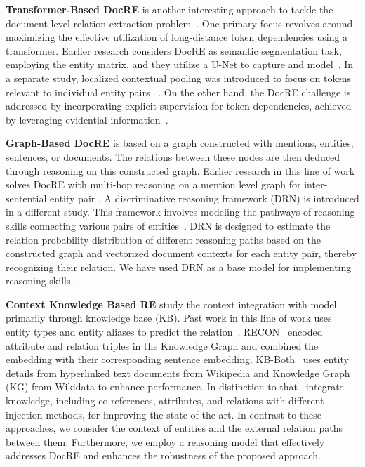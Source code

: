 \documentclass[letterpaper]{article} %
\begin{document}
\textbf{Transformer-Based DocRE} is another interesting approach to tackle the document-level relation extraction problem~\cite{zeng-etal-2020-double}. One primary focus revolves around maximizing the effective utilization of long-distance token dependencies using a transformer.
Earlier research considers DocRE as semantic segmentation task, employing the entity matrix, and they utilize a U-Net to capture and model~\cite{ijcai2021p551}.
In a separate study, localized contextual pooling was introduced to focus on tokens relevant to individual entity pairs ~\cite{DBLP:conf/aaai/Zhou0M021}.
On the other hand, the DocRE challenge is addressed by incorporating explicit supervision for token dependencies, achieved by leveraging evidential information~\cite{DBLP:conf/eacl/MaWO23}.

\textbf{Graph-Based DocRE} is based on a graph constructed with mentions, entities, sentences, or documents. The relations between these nodes are then deduced through reasoning on this constructed graph. Earlier research in this line of work solves DocRE with multi-hop reasoning on a mention level graph for inter-sentential entity pair \cite{zeng-etal-2020-double}.
A discriminative reasoning framework (DRN) is introduced in a different study. This framework involves modeling the pathways of reasoning skills connecting various pairs of entities~\cite{xu-etal-2021-discriminative}. DRN is designed to estimate the relation probability distribution of different reasoning paths based on the constructed graph and vectorized document contexts for each entity pair, thereby recognizing their relation. We have used DRN as a base model for implementing reasoning skills.

\textbf{Context Knowledge Based RE} study the context integration with model primarily through knowledge base (KB). Past work in this line of work uses entity types and entity aliases to predict the relation~\cite{vashishth-etal-2018-reside,10.1007/978-3-030-62419-4_11}. RECON~\cite{DBLP:conf/www/BastosN0MSHK21} encoded attribute and relation triples in the Knowledge Graph and combined the embedding with their corresponding sentence embedding. KB-Both~\cite{DBLP:conf/acl/VerlindenZDDD21} uses entity details from hyperlinked text documents from Wikipedia and Knowledge Graph (KG) from Wikidata to enhance performance.
In distinction to that~\cite{DBLP:conf/semweb/WangWSH22} integrate knowledge, including co-references, attributes, and relations with different injection methods, for improving the state-of-the-art. In contrast to these approaches, we consider the context of entities and the external relation paths between them. Furthermore, we employ a reasoning model that effectively addresses DocRE and enhances the robustness of the proposed approach.
\end{document}
